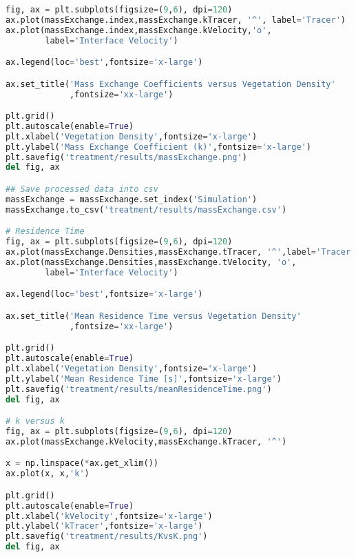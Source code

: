 \begin{lstlisting}[language=python]
fig, ax = plt.subplots(figsize=(9,6), dpi=120)
ax.plot(massExchange.index,massExchange.kTracer, '^', label='Tracer')
ax.plot(massExchange.index,massExchange.kVelocity,'o',
        label='Interface Velocity')

ax.legend(loc='best',fontsize='x-large')

ax.set_title('Mass Exchange Coefficients versus Vegetation Density'
             ,fontsize='xx-large')

plt.grid()
plt.autoscale(enable=True)
plt.xlabel('Vegetation Density',fontsize='x-large')
plt.ylabel('Mass Exchange Coefficient (k)',fontsize='x-large')
plt.savefig('treatment/results/massExchange.png')
del fig, ax

## Save processed data into csv
massExchange = massExchange.set_index('Simulation')
massExchange.to_csv('treatment/results/massExchange.csv')

# Residence Time
fig, ax = plt.subplots(figsize=(9,6), dpi=120)
ax.plot(massExchange.Densities,massExchange.tTracer, '^',label='Tracer')
ax.plot(massExchange.Densities,massExchange.tVelocity, 'o',
        label='Interface Velocity')

ax.legend(loc='best',fontsize='x-large')

ax.set_title('Mean Residence Time versus Vegetation Density'
             ,fontsize='xx-large')

plt.grid()
plt.autoscale(enable=True)
plt.xlabel('Vegetation Density',fontsize='x-large')
plt.ylabel('Mean Residence Time [s]',fontsize='x-large')
plt.savefig('treatment/results/meanResidenceTime.png')
del fig, ax

# k versus k
fig, ax = plt.subplots(figsize=(9,6), dpi=120)
ax.plot(massExchange.kVelocity,massExchange.kTracer, '^')

x = np.linspace(*ax.get_xlim())
ax.plot(x, x,'k')

plt.grid()
plt.autoscale(enable=True)
plt.xlabel('kVelocity',fontsize='x-large')
plt.ylabel('kTracer',fontsize='x-large')
plt.savefig('treatment/results/KvsK.png')
del fig, ax
\end{lstlisting}
